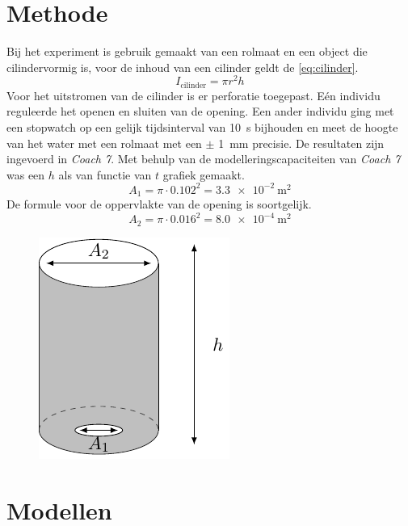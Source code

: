 \documentclass[numbers=endperiod]{scrartcl}
\begin{document}
\section{Methode}
Bij het experiment is gebruik gemaakt van een rolmaat en een object die cilindervormig is, voor de inhoud van een cilinder geldt de \ref{eq:cilinder}. 
\begin{equation}\label{eq:cilinder}
    I_{\text{cilinder}} = \pi r^2h
\end{equation}
Voor het uitstromen van de cilinder is er perforatie toegepast. Eén individu reguleerde het openen en sluiten van de opening. Een ander individu ging met een stopwatch op een gelijk tijdsinterval van \SI{10}{\second} bijhouden en meet de hoogte van het water met een rolmaat met een $\pm$ \SI{1}{\milli\meter} precisie. De resultaten zijn ingevoerd in \textit{Coach 7}. Met behulp van de modelleringscapaciteiten van \textit{Coach 7} was een $h$ als van functie van $t$ grafiek gemaakt.  
\begin{equation}
    A_1 = \pi \cdot 0.102^2 = \SI{3.3e-2}{\meter\squared}
\end{equation}
 De formule voor de oppervlakte van de opening is soortgelijk.
\begin{equation}
    A_2 = \pi \cdot 0.016^2 = \SI{8.0e-4}{\meter\squared}
\end{equation}


\begin{figure}[ht]
\centering
\includegraphics[scale=0.8]{beker.pdf}    
\label{fig:cilinder}
\end{figure}

\section{Modellen}
\end{document}
